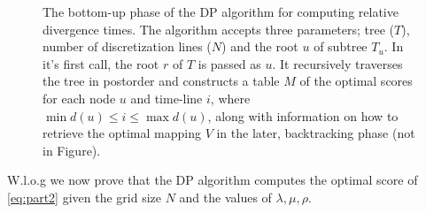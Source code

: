 \documentclass{llncs}
\begin{document}
\begin{figure}[t]
\begin{center}
\begin{tabular}{|rl|}
\hline  
\end{tabular}
\end{center}
\caption{The bottom-up phase of the DP algorithm for computing relative
divergence times. The algorithm accepts three parameters; tree ($T$), number of
discretization lines ($N$) and the root $u$ of subtree  $T_u$. In it's first
call, the root $r$ of $T$ is passed as $u$.  It recursively traverses the tree
in postorder and constructs a table $M$ of the optimal scores for each node $u$
and time-line $i$, where $\min d(u) \leq i \leq \max d(u)$, along with
information on how to retrieve the optimal mapping $V$ in the later,
backtracking phase (not in Figure).}
\label{fig:dp}
\end{figure}

W.l.o.g we now prove that the DP algorithm computes the optimal score of
\ref{eq:part2} given the grid size $N$ and the values of $\lambda,\mu,\rho$.
\end{document}
